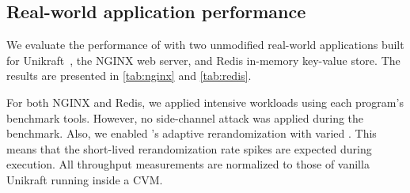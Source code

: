 \subsection{Real-world application performance}
\label{sec:eval:real-app}
We evaluate the performance of \thename with two unmodified real-world applications built for Unikraft~\cite{unikraft-dynamic-app}, the NGINX web server, and Redis in-memory key-value store.
The results are presented in \autoref{tab:nginx} and \autoref{tab:redis}.

 For both NGINX and Redis, we applied intensive workloads using each program's benchmark tools.
However, no side-channel attack was applied during the benchmark.
Also, we enabled \thename's adaptive rerandomization with varied . This means that the short-lived rerandomization rate spikes are expected during execution.
All throughput measurements are normalized to those of vanilla Unikraft running inside a CVM.


